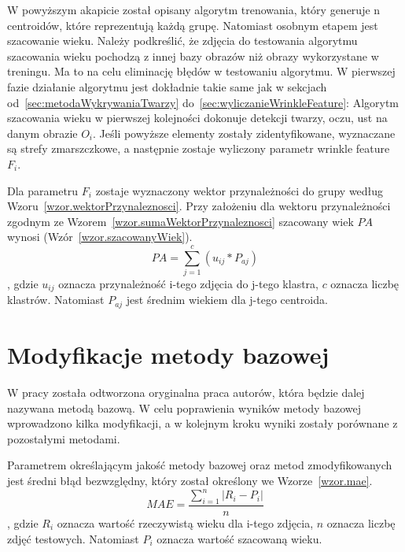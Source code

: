 \documentclass[a4paper,twoside,12pt]{book}
\begin{document}
    W powyższym akapicie został opisany algorytm trenowania, który generuje n centroidów, które reprezentują każdą
    grupę. Natomiast osobnym etapem jest szacowanie wieku. Należy podkreślić, że zdjęcia do testowania algorytmu szacowania wieku
    pochodzą z innej bazy obrazów niż obrazy wykorzystane w treningu. Ma to na celu eliminację błędów w testowaniu algorytmu.
    W pierwszej fazie działanie algorytmu jest dokładnie takie same jak w sekcjach od~\ref{sec:metodaWykrywaniaTwarzy}
    do~\ref{sec:wyliczanieWrinkleFeature}:
    Algorytm szacowania wieku w pierwszej kolejności dokonuje detekcji twarzy, oczu, ust na danym obrazie $O_{i}$.
    Jeśli powyższe elementy zostały zidentyfikowane, wyznaczane są strefy zmarszczkowe,
    a następnie zostaje wyliczony parametr wrinkle feature $F_{i}$.

    Dla parametru $F_{i}$ zostaje wyznaczony wektor przynależności do grupy
    według Wzoru~\ref{wzor.wektorPrzynaleznosci}.
    Przy założeniu dla wektoru przynależności zgodnym ze Wzorem~\ref{wzor.sumaWektorPrzynaleznosci} szacowany wiek
    $PA$
    wynosi
    (Wzór~\ref{wzor.szacowanyWiek}).
    \large
    \begin{equation}
        PA=\sum_{j=1}^{c}(u_{ij}*P_{aj})
        \label{wzor.szacowanyWiek}
    \end{equation}
    \normalsize
    , gdzie $u_{ij}$ oznacza przynależność i-tego zdjęcia do j-tego klastra, $c$ oznacza liczbę klastrów.
    Natomiast $P_{aj}$ jest średnim wiekiem dla j-tego centroida.

    \chapter{Modyfikacje metody bazowej}\label{ch:modyfikacje-metody-bazowej}
    W pracy została odtworzona oryginalna praca autorów, która
    będzie dalej nazywana metodą bazową.
    W celu poprawienia wyników metody bazowej wprowadzono kilka modyfikacji, a
    w kolejnym kroku wyniki zostały porównane z pozostałymi metodami.

    Parametrem określającym jakość metody bazowej oraz metod zmodyfikowanych jest średni błąd bezwzględny,
    który został określony we Wzorze~\ref{wzor.mae}.
    \large
    \begin{equation}
        MAE = \frac{\sum_{i=1}^{n}\left | R_{i}-P_{i} \right |}{n}
        \label{wzor.mae}
    \end{equation}
    \normalsize
    , gdzie $R_{i}$ oznacza wartość rzeczywistą wieku dla i-tego zdjęcia, $n$ oznacza liczbę zdjęć testowych.
    Natomiast $P_{i}$ oznacza wartość szacowaną wieku.
\end{document}
